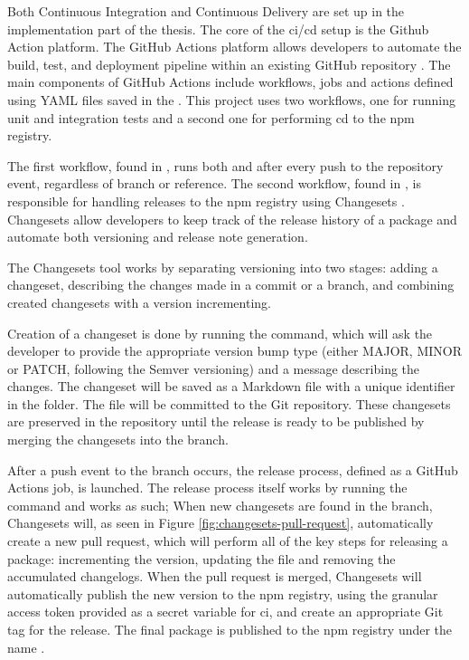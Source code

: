 Both Continuous Integration and Continuous Delivery are set up in the implementation part of the thesis. The core of the \acrshort{ci}/\acrshort{cd} setup is the Github Action platform. The GitHub Actions platform allows developers to automate the build, test, and deployment pipeline within an existing GitHub repository \cite{UnderstandingGitHubActions}. The main components of GitHub Actions include workflows, jobs and actions defined using YAML files saved in the . This project uses two workflows, one for running unit and integration tests and a second one for performing \acrfull{cd} to the \acrshort{npm} registry.

The first workflow, found in , runs both  and  after every push to the repository event, regardless of branch or reference. The second workflow, found in , is responsible for handling releases to the \acrshort{npm} registry using Changesets \cite{ChangesetsChangesets2023}. Changesets allow developers to keep track of the release history of a package and automate both versioning and release note generation.

The Changesets tool works by separating versioning into two stages: adding a changeset, describing the changes made in a commit or a branch, and combining created changesets with a version incrementing.


Creation of a changeset is done by running the  command, which will ask the developer to provide the appropriate version bump type (either MAJOR, MINOR or PATCH, following the Semver versioning) and a message describing the changes. The changeset will be saved as a Markdown file with a unique identifier in the  folder. The file will be committed to the Git repository. These changesets are preserved in the repository until the release is ready to be published by merging the changesets into the  branch.

After a push event to the  branch occurs, the release process, defined as a GitHub Actions job, is launched. The release process itself works by running the  command and works as such; When new changesets are found in the  branch, Changesets will, as seen in Figure \ref{fig:changesets-pull-request}, automatically create a new pull request, which will perform all of the key steps for releasing a package: incrementing the version, updating the  file and removing the accumulated changelogs. When the pull request is merged, Changesets will automatically publish the new version to the \acrshort{npm} registry, using the granular access token provided as a secret variable for \acrshort{ci}, and create an appropriate Git tag for the release. The final package is published to the \acrshort{npm} registry under the name  \cite{Tsmathevaluate2023}. 
